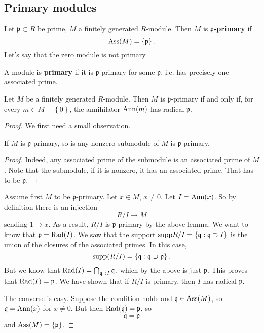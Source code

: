 \subsection{Primary modules}

\begin{definition} 
Let $\mathfrak{p} \subset R$ be prime, $M$ a finitely generated $R$-module. Then $M$ is
\textbf{$\mathfrak{p}$-primary} if 
\[ \mathrm{Ass}(M) = \left\{\mathfrak{p}\right\}.  \]
Let's say that the zero module is not primary.

A module is \textbf{primary} if it is $\mathfrak{p}$-primary for some
$\mathfrak{p}$, i.e. has precisely one associated prime. 
\end{definition} 

\begin{proposition} 
Let $M$ be a finitely generated $R$-module. Then $M$ is \textbf{$\mathfrak{p}$}-primary if
and only if, for every $m \in M - \left\{0\right\}$, 
the annihilator $\mathrm{Ann}(m)$ has radical $\mathfrak{p}$.
\end{proposition} 
\begin{proof} 
We first need a small observation.

\begin{lemma} 
If $M$ is $\mathfrak{p}$-primary, so is any nonzero submodule of $M$ is
$\mathfrak{p}$-primary.
\end{lemma} 
\begin{proof} 
Indeed, any associated prime of the submodule is an associated prime of $M$.
Note that the submodule, if it is nonzero, it has an associated prime. That has
to be $\mathfrak{p}$.
\end{proof} 

Assume first $M$ to be $\mathfrak{p}$-primary. Let $x \in M$, $x \neq 0$. Let
$I = \mathrm{Ann}(x)$. So by definition there is an injection
\[ R/I \to M  \]
sending $1 \to x$. As a result, $R/I$ is $\mathfrak{p}$-primary by the above
lemma. We want to know that $\mathfrak{p}  = \mathrm{Rad}(I)$. 
We saw that the support $\mathrm{supp} R/I = \left\{\mathfrak{q}: \mathfrak{q}
\supset I\right\}$ is the union of the closures of the associated primes. In
this case, 
\[ \mathrm{supp}(R/I) = \left\{\mathfrak{q}: \mathfrak{q} \supset \mathfrak{p}\right\}
.\]
But we know that $\mathrm{Rad}(I) = \bigcap_{\mathfrak{q} \supset I} \mathfrak{q}$,
which by the above is just $\mathfrak{p}$. This proves that $\mathrm{Rad}(I) =
\mathfrak{p}$.
We have shown that if $R/I$ is primary, then $I$ has radical $\mathfrak{p}$.

The converse is easy. 
Suppose the condition holds and $\mathfrak{q} \in \mathrm{Ass}(M)$, so $\mathfrak{q} =
\mathrm{Ann}(x)$ for $x \neq 0$. But then $\mathrm{Rad}(\mathfrak{q}) = \mathfrak{p}$, so 
\[ \mathfrak{q} = \mathfrak{p}  \] and $\mathrm{Ass}(M) = \left\{\mathfrak{p}\right\}$.
\end{proof} 

